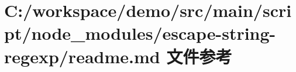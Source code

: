 \hypertarget{node__modules_2escape-string-regexp_2_r_e_a_d_m_e_8md}{}\section{C\+:/workspace/demo/src/main/script/node\+\_\+modules/escape-\/string-\/regexp/readme.md 文件参考}
\label{node__modules_2escape-string-regexp_2_r_e_a_d_m_e_8md}
